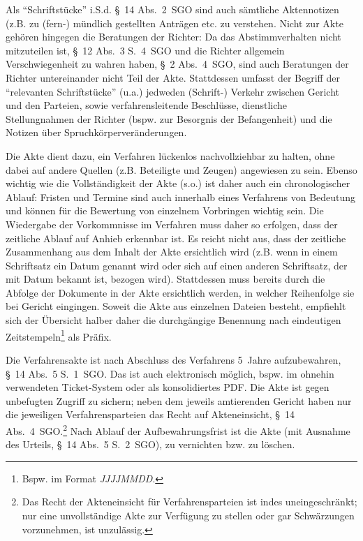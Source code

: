 Als \enquote{Schriftstücke} i.S.d. \S~14 Abs.~2~SGO sind auch sämtliche Aktennotizen (z.B. zu (fern-) mündlich gestellten Anträgen etc. zu verstehen.
Nicht zur Akte gehören hingegen die Beratungen der Richter:
Da das Abstimmverhalten nicht mitzuteilen ist, \S~12 Abs.~3 S.~4~SGO und die Richter allgemein Verschwiegenheit zu wahren haben, \S~2 Abs.~4~SGO, sind auch Beratungen der Richter untereinander nicht Teil der Akte.
Stattdessen umfasst der Begriff der \enquote{relevanten Schriftstücke} (u.a.) jedweden (Schrift-) Verkehr zwischen Gericht und den Parteien, sowie verfahrensleitende Beschlüsse, dienstliche Stellungnahmen der Richter (bspw. zur Besorgnis der Befangenheit) und die Notizen über Spruchkörperveränderungen.

Die Akte dient dazu, ein Verfahren lückenlos nachvollziehbar zu halten, ohne dabei auf andere Quellen (z.B. Beteiligte und Zeugen) angewiesen zu sein.
Ebenso wichtig wie die Vollständigkeit der Akte (s.o.) ist daher auch ein chronologischer Ablauf:
Fristen und Termine sind auch innerhalb eines Verfahrens von Bedeutung und können für die Bewertung von einzelnem Vorbringen wichtig sein.
Die Wiedergabe der Vorkommnisse im Verfahren muss daher so erfolgen, dass der zeitliche Ablauf auf Anhieb erkennbar ist.
Es reicht nicht aus, dass der zeitliche Zusammenhang aus dem Inhalt der Akte ersichtlich wird (z.B. wenn in einem Schriftsatz ein Datum genannt wird oder sich auf einen anderen Schriftsatz, der mit Datum bekannt ist, bezogen wird).
Stattdessen muss bereits durch die Abfolge der Dokumente in der Akte ersichtlich werden, in welcher Reihenfolge sie bei Gericht eingingen.
Soweit die Akte aus einzelnen Dateien besteht, empfiehlt sich der Übersicht halber daher die durchgängige Benennung nach eindeutigen Zeitstempeln\footnote{Bspw. im Format \emph{JJJJMMDD}.} als Präfix.

Die Verfahrensakte ist nach Abschluss des Verfahrens 5~Jahre aufzubewahren, \S~14 Abs.~5 S.~1~SGO.
Das ist auch elektronisch möglich, bspw. im ohnehin verwendeten Ticket-System oder als konsolidiertes PDF.
Die Akte ist gegen unbefugten Zugriff zu sichern; neben dem jeweils amtierenden Gericht haben nur die jeweiligen Verfahrensparteien das Recht auf Akteneinsicht, \S~14 Abs.~4~SGO.\footnote{Das Recht der Akteneinsicht für Verfahrensparteien ist indes uneingeschränkt; nur eine unvollständige Akte zur Verfügung zu stellen oder gar Schwärzungen vorzunehmen, ist unzulässig.}
Nach Ablauf der Aufbewahrungsfrist ist die Akte (mit Ausnahme des Urteils, \S~14 Abs.~5 S.~2~SGO), zu vernichten bzw. zu löschen.

